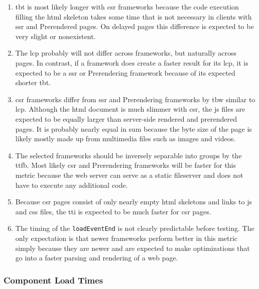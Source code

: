 \documentclass[a4paper, 12pt]{article}
\begin{document}
\begin{enumerate}
  \item \acrshort{tbt} is most likely longer with \acrshort{csr} frameworks because the code execution filling the \acrshort{html} skeleton takes some time that is not necessary in clients with \acrshort{ssr} and Prerendered pages.
  On delayed pages this difference is expected to be very slight or nonexistent.
  \item The \acrshort{lcp} probably will not differ across frameworks, but naturally across pages.
  In contrast, if a framework does create a faster result for its \acrshort{lcp}, it is expected to be a \acrshort{ssr} or Prerendering framework because of its expected shorter \acrshort{tbt}.
  \item \acrshort{csr} frameworks differ from \acrshort{ssr} and Prerendering frameworks by \acrlong{tbw} similar to \acrlong{lcp}.
  Although the \acrshort{html} document is much slimmer with \acrshort{csr}, the \acrshort{js} files are expected to be equally larger than server-side rendered and prerendered pages.
  It is probably nearly equal in sum because the byte size of the page is likely mostly made up from multimedia files such as images and videos. 
  \item The selected frameworks should be inversely separable into groups by the \acrlong{ttfb}.
  Most likely \acrshort{csr} and Prerendering frameworks will be faster for this metric because the web server can serve as a static fileserver and does not have to execute any additional code.
  \item Because \acrshort{csr} pages consist of only nearly empty \acrshort{html} skeletons and links to \acrshort{js} and \acrshort{css} files, the \acrshort{tti} is expected to be much faster for \acrshort{csr} pages.
  \item The timing of the \verb|loadEventEnd| is not clearly predictable before testing.
  The only expectation is that newer frameworks perform better in this metric simply because they are newer and are expected to make optimizations that go into a faster parsing and rendering of a web page.
\end{enumerate}
  
\subsubsection{Component Load Times}\label{subsubsec:componentloadtimes}
% 
\end{document}
